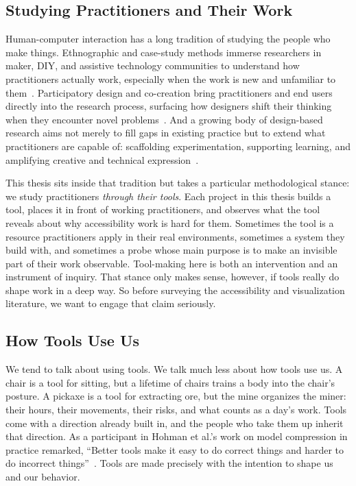 \documentclass[12pt]{cmuthesis}
\begin{document}
\subsection{Studying Practitioners and Their Work}
 
Human-computer interaction has a long tradition of studying the people who make things. Ethnographic and case-study methods immerse researchers in maker, DIY, and assistive technology communities to understand how practitioners actually work, especially when the work is new and unfamiliar to them~\cite{Hurst2011, Hook2014, Hurst2013Making}. Participatory design and co-creation bring practitioners and end users directly into the research process, surfacing how designers shift their thinking when they encounter novel problems~\cite{spinuzzi2005methodology, Hamidi2018, Sanders2014CoDesign}. And a growing body of design-based research aims not merely to fill gaps in existing practice but to extend what practitioners are capable of: scaffolding experimentation, supporting learning, and amplifying creative and technical expression~\cite{Jiang2023, Chundury2024, Hahn2016, To2023, Kang2022}.
 
This thesis sits inside that tradition but takes a particular methodological stance: we study practitioners \textit{through their tools}. Each project in this thesis builds a tool, places it in front of working practitioners, and observes what the tool reveals about why accessibility work is hard for them. Sometimes the tool is a resource practitioners apply in their real environments, sometimes a system they build with, and sometimes a probe whose main purpose is to make an invisible part of their work observable. Tool-making here is both an intervention and an instrument of inquiry. That stance only makes sense, however, if tools really do shape work in a deep way. So before surveying the accessibility and visualization literature, we want to engage that claim seriously.
 
\subsection{How Tools Use Us}
 
We tend to talk about using tools. We talk much less about how tools use us. A chair is a tool for sitting, but a lifetime of chairs trains a body into the chair's posture. A pickaxe is a tool for extracting ore, but the mine organizes the miner: their hours, their movements, their risks, and what counts as a day's work. Tools come with a direction already built in, and the people who take them up inherit that direction. As a participant in Hohman et al.'s work on model compression in practice remarked, ``Better tools make it easy to do correct things and harder to do incorrect things''~\cite{Hohman2024}. Tools are made precisely with the intention to shape us and our behavior.
 
\end{document}
